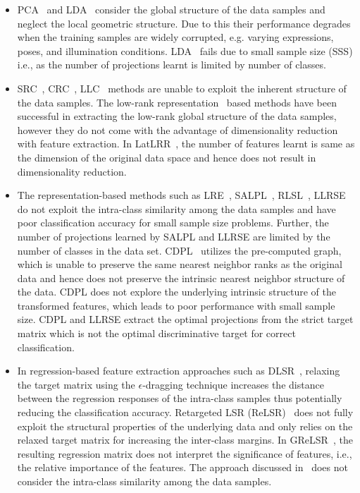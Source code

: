 \begin{itemize}
%
\item PCA~\cite{PCA} and LDA~\cite{LDA} consider the global structure of the data samples and neglect the local geometric structure. Due to this their performance degrades when the training samples are widely corrupted, e.g. varying expressions, poses, and illumination conditions. LDA~\cite{LDA} fails due to small sample size (SSS) i.e., as the number of projections learnt is limited by number of classes. 
%
\item SRC~\cite{SRC}, CRC~\cite{CRC}, LLC~\cite{LLC} methods are unable to exploit the inherent structure of the data samples. The low-rank representation~\cite{LRR_subspace, Learn_Bal_Unbal_graph, LatLRR} based methods have been successful in extracting the low-rank global structure of the data samples, however they do not come with the advantage of dimensionality reduction with feature extraction. In LatLRR~\cite{LatLRR}, the number of features learnt is same as the dimension of the original data space and hence does not result in dimensionality reduction.
%
\item The representation-based methods such as LRE~\cite{LRE}, SALPL~\cite{SALPL}, RLSL~\cite{RLSL}, LLRSE~\cite{LLRSE} do not exploit the intra-class similarity among the data samples and have poor classification accuracy for small sample size problems. Further, the number of projections learned by SALPL and LLRSE are limited by the number of classes in the data set. CDPL~\cite{CDPL} utilizes the pre-computed graph, which is unable to preserve the same nearest neighbor ranks as the original data and hence does not preserve the intrinsic nearest neighbor structure of the data. CDPL does not explore the underlying intrinsic structure of the transformed features, which leads to poor performance with small sample size. CDPL and LLRSE extract the optimal projections from the strict target matrix which is not the optimal discriminative target for correct classification.
%
\item In regression-based feature extraction approaches such as DLSR~\cite{DLSR}, relaxing the target matrix using the $\epsilon$-dragging technique increases the distance between the regression responses of the intra-class samples thus potentially reducing the classification accuracy. Retargeted LSR (ReLSR)~\cite{ReLSR} does not fully exploit the structural properties of the underlying data and only relies on the relaxed target matrix for increasing the inter-class margins. In GReLSR~\cite{GReLSR}, the resulting regression matrix does not interpret the significance of features, i.e., the relative importance of the features. The approach discussed in~\cite{ICS_DLSR} does not consider the intra-class similarity among the data samples.  
%
\end{itemize}
